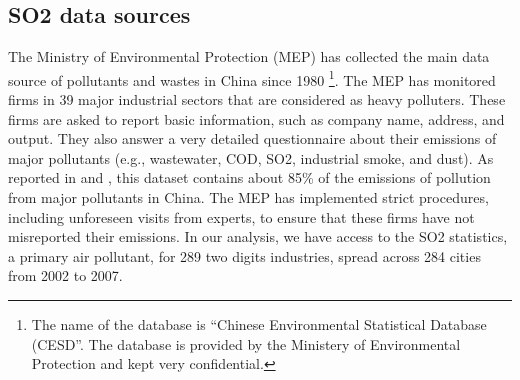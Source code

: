 \documentclass[12pt]{article}
\begin{document}
\subsection{SO2 data sources} \label{sec:so2}

The Ministry of Environmental Protection (MEP) has collected the main data source of pollutants and wastes in China since 1980 \footnote{The name of the database is “Chinese Environmental Statistical Database (CESD”. The database is provided by the Ministery of Environmental Protection and kept very confidential.}. The MEP has monitored firms in 39 major industrial sectors that are considered as heavy polluters. These firms are asked to report basic information, such as company name, address, and output. They also answer a very detailed questionnaire about their emissions of major pollutants (e.g., wastewater, COD, SO2, industrial smoke, and dust). As reported in \cite{Wu2017-bl} and \cite{Jiang2014-pf}, this dataset contains about 85\% of the emissions of pollution from major pollutants in China. The MEP has implemented strict procedures, including unforeseen visits from experts, to ensure that these firms have not misreported their emissions. In our analysis, we have access to the SO2 statistics, a primary air pollutant, for 289 two digits industries, spread across 284 cities from 2002 to 2007.
\end{document}
